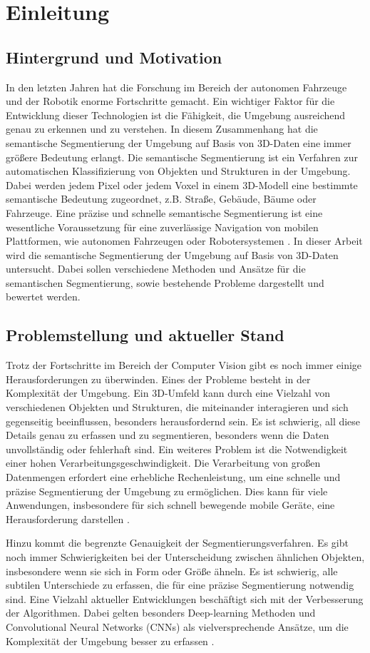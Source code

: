 \chapter{Einleitung}

\section{Hintergrund und Motivation}

In den letzten Jahren hat die Forschung im Bereich der autonomen Fahrzeuge und
der Robotik enorme Fortschritte gemacht. Ein wichtiger Faktor für die
Entwicklung dieser Technologien ist die Fähigkeit, die Umgebung ausreichend
genau zu erkennen und zu verstehen. In diesem Zusammenhang hat die semantische
Segmentierung der Umgebung auf Basis von 3D-Daten eine immer größere Bedeutung
erlangt. Die semantische Segmentierung ist ein Verfahren zur automatischen
Klassifizierung von Objekten und Strukturen in der Umgebung. Dabei werden jedem
Pixel oder jedem Voxel in einem 3D-Modell eine bestimmte semantische Bedeutung
zugeordnet, z.B. Straße, Gebäude, Bäume oder Fahrzeuge. Eine präzise und
schnelle semantische Segmentierung ist eine wesentliche Voraussetzung für eine
zuverlässige Navigation von mobilen Plattformen, wie autonomen Fahrzeugen oder
Robotersystemen \cite{9102769}. In dieser Arbeit wird die semantische
Segmentierung der Umgebung auf Basis von 3D-Daten untersucht. Dabei sollen
verschiedene Methoden und Ansätze für die semantischen Segmentierung, sowie
bestehende Probleme dargestellt und bewertet werden.

\section{Problemstellung und aktueller Stand}

Trotz der Fortschritte im Bereich der Computer Vision gibt es noch immer einige
Herausforderungen zu überwinden. Eines der Probleme besteht in der Komplexität
der Umgebung. Ein 3D-Umfeld kann durch eine Vielzahl von verschiedenen Objekten
und Strukturen, die miteinander interagieren und sich gegenseitig beeinflussen,
besonders herausfordernd sein. Es ist schwierig, all diese Details genau zu
erfassen und zu segmentieren, besonders wenn die Daten unvollständig oder
fehlerhaft sind. Ein weiteres Problem ist die Notwendigkeit einer hohen
Verarbeitungsgeschwindigkeit. Die Verarbeitung von großen Datenmengen erfordert
eine erhebliche Rechenleistung, um eine schnelle und präzise Segmentierung der
Umgebung zu ermöglichen. Dies kann für viele Anwendungen, insbesondere für sich
schnell bewegende mobile Geräte, eine Herausforderung darstellen \cite{9420573}.

Hinzu kommt die begrenzte Genauigkeit der Segmentierungsverfahren. Es gibt noch
immer Schwierigkeiten bei der Unterscheidung zwischen ähnlichen Objekten,
insbesondere wenn sie sich in Form oder Größe ähneln. Es ist schwierig, alle
subtilen Unterschiede zu erfassen, die für eine präzise Segmentierung notwendig
sind. Eine Vielzahl aktueller Entwicklungen beschäftigt sich mit der
Verbesserung der Algorithmen. Dabei gelten besonders Deep-learning Methoden und
Convolutional Neural Networks (CNNs) als vielversprechende Ansätze, um die Komplexität der Umgebung
besser zu erfassen \cite{9423307,8100085}.